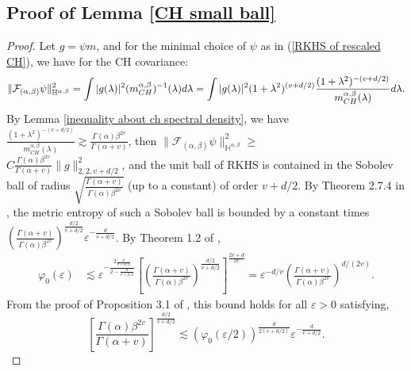 \documentclass[ejs,noshowframe]{imsart}
\theoremstyle{plain}
\theoremstyle{definition}
\theoremstyle{remark}
\begin{document}
\begin{appendix}
\subsection{Proof of Lemma \ref{CH small ball}}
\begin{proof}
 Let $g= \psi m$, and for  the minimal choice of $\psi$ as in (\ref{RKHS of rescaled CH}), we have for the CH covariance:
\begin{displaymath}
\|\mathcal{F}_{(\alpha,\beta)} \psi\|_{\mathbb{H}^{\alpha,\beta}}^2  =\int |g(\lambda)|^2 (m_{CH}^{\alpha,\beta})^{-1}(\lambda) d\lambda\\
=\int |g(\lambda)|^2 (1+\lambda^2)^{(v+d/2)}\frac{(1+\lambda^2)^{-(v+d/2)}}{m_{CH}^{\alpha,\beta}(\lambda)} d\lambda.
\end{displaymath}
By Lemma \ref{inequality about ch spectral density}, we have $\frac{(1+\lambda^2)^{-(v+d/2)}}{m_{CH}^{\alpha,\beta}(\lambda)} \gtrsim \frac{\Gamma(\alpha) \beta^{2v}}{\Gamma(\alpha+v)}$, then $\|\mathcal{F}_{(\alpha,\beta)} \psi\|_{\mathbb{H}^{\alpha,\beta}}^2  \geq$\\ $C \frac{\Gamma(\alpha) \beta^{2v}}{\Gamma(\alpha+v)} \|g\|^2_{2,2,v+d/2}$, and the unit ball of RKHS is contained in the Sobolev ball  of radius $\sqrt{\frac{\Gamma(\alpha+v)}{\Gamma(\alpha) \beta^{2v}}}$ (up to a constant) of order $v+d/2$.  By  Theorem 2.7.4 in \cite{wellner2013weak}, the metric entropy of  such a Sobolev ball is bounded by a constant times $(\frac{\Gamma(\alpha+v)}{\Gamma(\alpha) \beta^{2v}})^{\frac{d/2}{v+d/2}}  \varepsilon^{-\frac{d}{v+d/2}}$. By Theorem 1.2 of \cite{li1999approximation},
\begin{equation}\label{small ball of ch invariation}
\begin{split}
    \varphi_0(\varepsilon) &\lesssim \varepsilon ^{-\frac{2 \frac{d}{v+d/2}}{2-\frac{d}{v+d/2}}}\left[\left(\frac{\Gamma(\alpha+v)}{\Gamma(\alpha) \beta^{2v}} \right)^{\frac{d/2}{v+d/2}} \right]^{\frac{2v+d}{2v}}=\varepsilon^{-d/v} \left(\frac{\Gamma(\alpha+v)}{\Gamma(\alpha) \beta^{2v}}\right)^{d/(2v)}.
    \end{split}
\end{equation}
From the proof of  Proposition 3.1 of \citet{li1999approximation}, this bound holds for all $\varepsilon >0$ satisfying,
\begin{displaymath}
    \left[\frac{\Gamma(\alpha) \beta^{2v}}{\Gamma(\alpha+v)} \right]^{\frac{d/2}{v+d/2}} \lesssim (\varphi_0(\varepsilon/2))^{\frac{d}{2(v+d/2)}} \varepsilon^{-\frac{d}{v+d/2}}.
\end{displaymath}

\end{proof}
\end{appendix}
\end{document}
